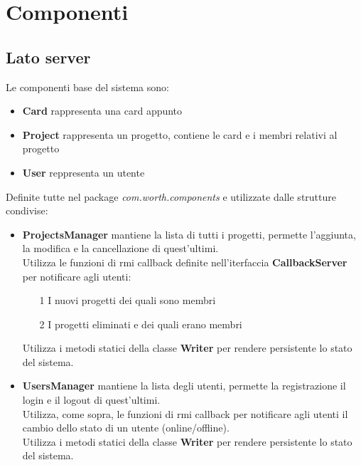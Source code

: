 \documentclass[11pt]{report}
\begin{document}
	\section{Componenti}
	
	\subsection{Lato server}
		Le componenti base del sistema sono:
		
		\begin{itemize}
			\item \textbf{Card} rappresenta una card appunto
			
			\item \textbf{Project} rappresenta un progetto, contiene le card e i membri relativi al progetto
			
			\item \textbf{User} reppresenta un utente
		\end{itemize}
	
		Definite tutte nel package \textit{com.worth.components} e utilizzate dalle strutture condivise:
		
		\begin{itemize}
			\item \textbf{ProjectsManager} mantiene la lista di tutti i progetti, permette l'aggiunta, la modifica e la cancellazione di quest'ultimi.\\
			Utilizza le funzioni di rmi callback definite nell'iterfaccia \textbf{CallbackServer} per notificare agli utenti:
			\begin{itemize}
				\item[1] I nuovi progetti dei quali sono membri
				\item[2] I progetti eliminati e dei quali erano membri
			\end{itemize}
			Utilizza i metodi statici della classe \textbf{Writer} per rendere persistente lo stato del sistema.
			
			\item \textbf{UsersManager} mantiene la lista degli utenti, permette la registrazione il login e il logout di quest'ultimi.\\
			Utilizza, come sopra, le funzioni di rmi callback per notificare agli utenti il cambio dello stato di un utente (online/offline).\\
			Utilizza i metodi statici della classe \textbf{Writer} per rendere persistente lo stato del sistema.
			
		\end{itemize}
	
\end{document}
